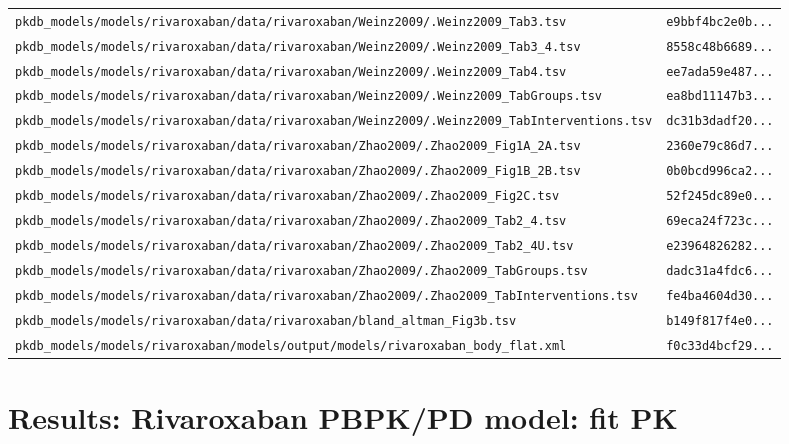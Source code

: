 \documentclass{article}
\begin{document}
\begin{longtable}{ll}
\texttt{pkdb\_models/models/rivaroxaban/data/rivaroxaban/Weinz2009/.Weinz2009\_Tab3.tsv} & \texttt{e9bbf4bc2e0b...} \\
\texttt{pkdb\_models/models/rivaroxaban/data/rivaroxaban/Weinz2009/.Weinz2009\_Tab3\_4.tsv} & \texttt{8558c48b6689...} \\
\texttt{pkdb\_models/models/rivaroxaban/data/rivaroxaban/Weinz2009/.Weinz2009\_Tab4.tsv} & \texttt{ee7ada59e487...} \\
\texttt{pkdb\_models/models/rivaroxaban/data/rivaroxaban/Weinz2009/.Weinz2009\_TabGroups.tsv} & \texttt{ea8bd11147b3...} \\
\texttt{pkdb\_models/models/rivaroxaban/data/rivaroxaban/Weinz2009/.Weinz2009\_TabInterventions.tsv} & \texttt{dc31b3dadf20...} \\
\texttt{pkdb\_models/models/rivaroxaban/data/rivaroxaban/Zhao2009/.Zhao2009\_Fig1A\_2A.tsv} & \texttt{2360e79c86d7...} \\
\texttt{pkdb\_models/models/rivaroxaban/data/rivaroxaban/Zhao2009/.Zhao2009\_Fig1B\_2B.tsv} & \texttt{0b0bcd996ca2...} \\
\texttt{pkdb\_models/models/rivaroxaban/data/rivaroxaban/Zhao2009/.Zhao2009\_Fig2C.tsv} & \texttt{52f245dc89e0...} \\
\texttt{pkdb\_models/models/rivaroxaban/data/rivaroxaban/Zhao2009/.Zhao2009\_Tab2\_4.tsv} & \texttt{69eca24f723c...} \\
\texttt{pkdb\_models/models/rivaroxaban/data/rivaroxaban/Zhao2009/.Zhao2009\_Tab2\_4U.tsv} & \texttt{e23964826282...} \\
\texttt{pkdb\_models/models/rivaroxaban/data/rivaroxaban/Zhao2009/.Zhao2009\_TabGroups.tsv} & \texttt{dadc31a4fdc6...} \\
\texttt{pkdb\_models/models/rivaroxaban/data/rivaroxaban/Zhao2009/.Zhao2009\_TabInterventions.tsv} & \texttt{fe4ba4604d30...} \\
\texttt{pkdb\_models/models/rivaroxaban/data/rivaroxaban/bland\_altman\_Fig3b.tsv} & \texttt{b149f817f4e0...} \\
\texttt{pkdb\_models/models/rivaroxaban/models/output/models/rivaroxaban\_body\_flat.xml} & \texttt{f0c33d4bcf29...} \\
\end{longtable}

\section{Results: Rivaroxaban PBPK/PD model: fit PK}
\end{document}
